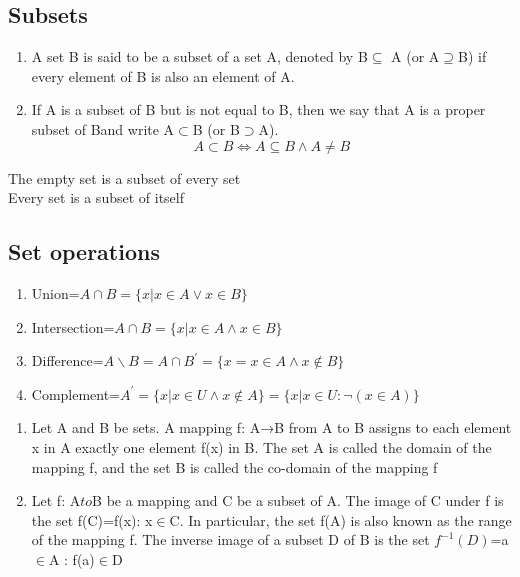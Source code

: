 \documentclass[cn,10pt,math=newtx,citestyle=gb7714-2015,bibstyle=gb7714-2015]{elegantbook}
\begin{document}
\subsection{Subsets}
\begin{definition}[Subsets]
	\begin{enumerate}
		\item A set B is said to be a subset of a set A, denoted by B$\subseteq$ A (or A$\supseteq$B) if every element of B is also an element of A.
		\item If A is a subset of B but is not equal to B, then we say that A is a proper subset of Band write A$\subset$B (or B$\supset$A).\begin{equation}
			A\subset B\Leftrightarrow A\subseteq B\land A\neq B
		\end{equation}
	\end{enumerate} 
\end{definition}

\begin{note}
	The empty set is a subset of every set\\
	Every set is a subset of itself
\end{note}
	
\subsection{Set operations}
\begin{definition}[operations]
	\begin{enumerate}
        \item Union=$A\cap B=\{x|x\in A\lor x\in B\}$
        \item Intersection=$A\cap B=\{x|x\in A\land x\in B\}$
        \item Difference=$A\backslash B=A\cap B^{'}=\{x=x\in A\land x\notin B\}$
        \item Complement=$A^{'}=\{x|x\in U\land x\notin A\}=\{x|x\in U:\lnot (x\in A)\}$
    \end{enumerate}
\end{definition}
\newpage

\begin{definition}[Mappings]
\begin{enumerate}
    \item Let A and B be sets. A mapping f: A→B from A to B assigns to 
each element x in A exactly one element f(x) in B. The set A is 
called the domain of the mapping f, and the set B is called the 
co-domain of the mapping f
    \item Let f: A$to$B be a mapping and C be a subset of A. The image of 
C under f is the set f(C)={f(x): x$\in$C}. In particular, the set f(A) 
is also known as the range of the mapping f. The inverse image
of a subset D of B is the set $f^{−1}(D)$={a$\in$A : f(a)$\in$D}
\end{enumerate}

\end{definition}
\end{document}

